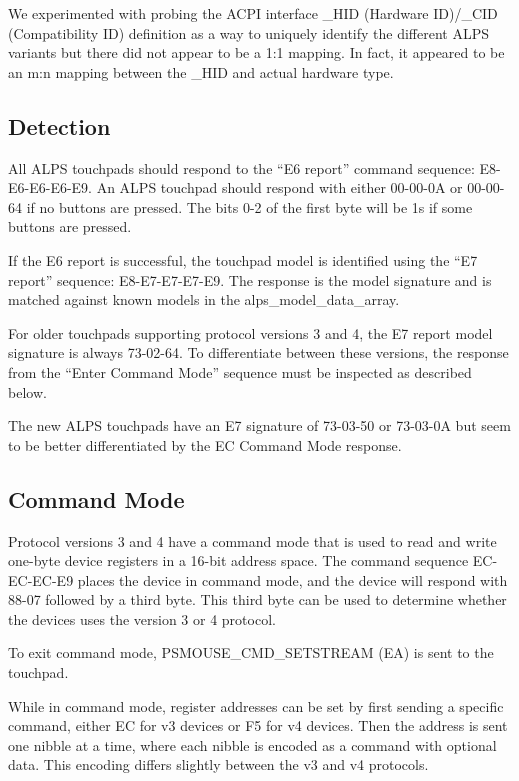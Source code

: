 \documentclass[a4paper,8pt,english]{sphinxmanual}
\begin{document}
We experimented with probing the ACPI interface \_HID (Hardware ID)/\_CID
(Compatibility ID) definition as a way to uniquely identify the
different ALPS variants but there did not appear to be a 1:1 mapping.
In fact, it appeared to be an m:n mapping between the \_HID and actual
hardware type.


\subsection{Detection}
\label{input/devices/alps:detection}
All ALPS touchpads should respond to the ``E6 report'' command sequence:
E8-E6-E6-E6-E9. An ALPS touchpad should respond with either 00-00-0A or
00-00-64 if no buttons are pressed. The bits 0-2 of the first byte will be 1s
if some buttons are pressed.

If the E6 report is successful, the touchpad model is identified using the ``E7
report'' sequence: E8-E7-E7-E7-E9. The response is the model signature and is
matched against known models in the alps\_model\_data\_array.

For older touchpads supporting protocol versions 3 and 4, the E7 report
model signature is always 73-02-64. To differentiate between these
versions, the response from the ``Enter Command Mode'' sequence must be
inspected as described below.

The new ALPS touchpads have an E7 signature of 73-03-50 or 73-03-0A but
seem to be better differentiated by the EC Command Mode response.


\subsection{Command Mode}
\label{input/devices/alps:command-mode}
Protocol versions 3 and 4 have a command mode that is used to read and write
one-byte device registers in a 16-bit address space. The command sequence
EC-EC-EC-E9 places the device in command mode, and the device will respond
with 88-07 followed by a third byte. This third byte can be used to determine
whether the devices uses the version 3 or 4 protocol.

To exit command mode, PSMOUSE\_CMD\_SETSTREAM (EA) is sent to the touchpad.

While in command mode, register addresses can be set by first sending a
specific command, either EC for v3 devices or F5 for v4 devices. Then the
address is sent one nibble at a time, where each nibble is encoded as a
command with optional data. This encoding differs slightly between the v3 and
v4 protocols.
\end{document}
